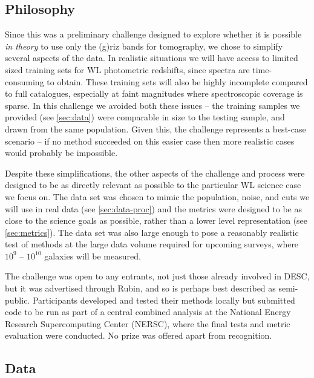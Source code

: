 \documentclass[twocolumn,twocolappendix]{aastex63}
\begin{document}
\subsection{Philosophy}

Since this was a preliminary challenge designed to explore whether it is possible \emph{in theory}
to use only the (g)riz bands for tomography, we chose to simplify several aspects of the data.  In realistic 
situations we will have access to limited sized training sets for WL photometric redshifts, since 
spectra are time-consuming to obtain.  These training sets will also be highly incomplete compared
to full catalogues, especially at faint magnitudes where spectroscopic coverage is sparse.  In this
challenge we avoided both these issues -- the training samples we provided (see \autoref{sec:data}) were comparable
in size to the testing sample, and drawn from the same population.  Given this, the challenge
represents a best-case scenario -- if no method succeeded on this easier case then more realistic
cases would probably be impossible.

Despite these simplifications, the other aspects of the challenge and process were designed to be
as directly relevant as possible to the particular WL science case we focus on.  The data set
was chosen to mimic the population, noise, and cuts we will use in real data (see \autoref{sec:data-proc}) 
and the metrics were designed to be as close to the science goals as possible, rather than a lower
level representation (see \autoref{sec:metrics}). The data set was also large enough to pose a 
reasonably realistic test of methods at the large data volume required for upcoming surveys, where
$10^9$ -- $10^{10}$ galaxies will be measured.

The challenge was open to any entrants, not just those already involved in DESC, but it was
advertised through Rubin, and so is perhaps best described as semi-public.
Participants developed and tested their methods locally but submitted code to be run as part of a central
combined analysis at the National Energy Research
Supercomputing Center (NERSC), where the final tests and metric evaluation were conducted.  No prize was offered apart from recognition.

\subsection{Data}
\label{sec:data}
\end{document}
